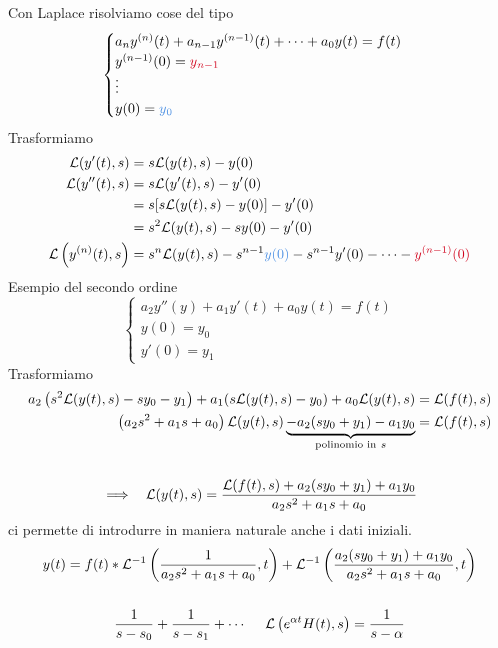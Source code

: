 Con Laplace risolviamo cose del tipo
\begin{equation*}
\begin{cases}
a_{n} y^{(n)}(t) + a_{n - 1} y^{(n - 1)}(t) + \cdots + a_{0} y(t) = f(t)\\
y^{(n - 1)}(0) = \textcolor[rgb]{0.82, 0.01, 0.11}{y}\textcolor[rgb]{0.82, 0.01, 0.11}{_{n - 1}}\\
\vdots \\
y(0) = \textcolor[rgb]{0.29, 0.56, 0.89}{y}\textcolor[rgb]{0.29, 0.56, 0.89}{_{0}}
\end{cases}
\end{equation*}
Trasformiamo
\begin{equation*}
\begin{aligned}
\Lc(y'(t), s) & = s\Lc(y(t), s) - y(0)\\
\Lc(y''(t), s) & = s\Lc(y'(t), s) - y'(0)\\
 & = s[s\Lc(y(t), s) - y(0)] - y'(0)\\
 & = s^{2}\Lc(y(t), s) - sy(0) - y'(0)\\
\Lc\left(y^{(n)}(t), s\right) & = s^{n}\Lc(y(t), s) - s^{n - 1}\textcolor[rgb]{0.29, 0.56, 0.89}{y}\textcolor[rgb]{0.29, 0.56, 0.89}{(}\textcolor[rgb]{0.29, 0.56, 0.89}{0}\textcolor[rgb]{0.29, 0.56, 0.89}{)} - s^{n - 1} y'(0) - \cdots - \textcolor[rgb]{0.82, 0.01, 0.11}{y}\textcolor[rgb]{0.82, 0.01, 0.11}{^{(n - 1)}}\textcolor[rgb]{0.82, 0.01, 0.11}{(}\textcolor[rgb]{0.82, 0.01, 0.11}{0}\textcolor[rgb]{0.82, 0.01, 0.11}{)}
\end{aligned}
\end{equation*}
Esempio del secondo ordine
\begin{equation*}
\begin{cases}
a_{2} y''(y) + a_{1} y'(t) + a_{0} y(t) = f(t)\\
y(0) = y_{0}\\
y'(0) = y_{1}
\end{cases}
\end{equation*}
Trasformiamo
\begin{gather*}
\begin{aligned}
a_{2}\left(s^{2}\mathcal{L}(y(t), s) - sy_{0} - y_{1}\right) + a_{1}(s\mathcal{L}(y(t), s) - y_{0}) + a_{0}\mathcal{L}(y(t), s) & = \mathcal{L}(f(t), s)\\
\left(a_{2} s^{2} + a_{1} s + a_{0}\right)\mathcal{L}(y(t), s)\underbrace{- a_{2}(sy_{0} + y_{1}) - a_{1} y_{0}}_{\text{polinomio in} \ s} & = \mathcal{L}(f(t), s)
\end{aligned}\\
\\
\implies \ \ \mathcal{L}(y(t), s) = \frac{\mathcal{L}(f(t), s) + a_{2}(sy_{0} + y_{1}) + a_{1} y_{0}}{a_{2} s^{2} + a_{1} s + a_{0}}
\end{gather*}
ci permette di introdurre in maniera naturale anche i dati iniziali.
\begin{gather*}
y(t) = f(t) *\Lc^{- 1}\left(\frac{1}{a_{2} s^{2} + a_{1} s + a_{0}}, t\right) + \Lc^{- 1}\left(\frac{a_{2}(sy_{0} + y_{1}) + a_{1} y_{0}}{a_{2} s^{2} + a_{1} s + a_{0}}, t\right)\\
\\
\frac{1}{s - s_{0}} + \frac{1}{s - s_{1}} + \cdots \ \ \ \ \Lc\left(e^{\alpha t} H(t), s\right) = \frac{1}{s - \alpha}
\end{gather*}

